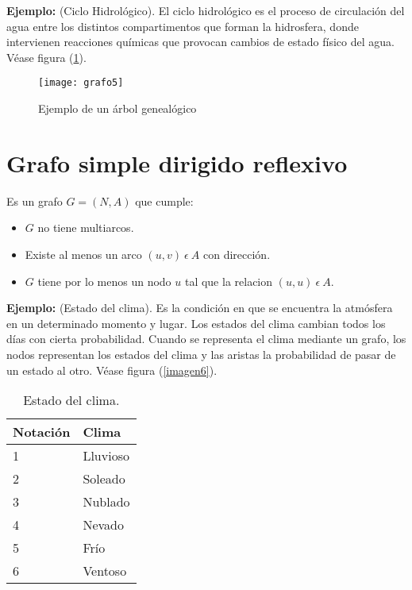 \documentclass[a4paper, 11pt]{article}
\begin{document}
\textbf{Ejemplo:} (Ciclo Hidrológico). El ciclo hidrológico es el proceso de circulación del agua entre los distintos compartimentos que forman la hidrosfera, donde intervienen reacciones químicas que provocan cambios de estado físico del agua. Véase figura (\ref{imagen5}).

\begin{figure}[H]
  \centering
    \texttt{[image: grafo5]}
  \caption{Ejemplo de un árbol genealógico}
  \label{imagen5}
\end{figure}






\section*{Grafo simple dirigido reflexivo}

Es un grafo $G = (N, A)$ que cumple:
\begin{itemize}
\item $G$ no tiene multiarcos.
\item Existe al menos un arco $(u, v) \ \epsilon \ A$ con dirección.
\item $G$ tiene por lo menos un nodo $u$ tal que la relacion $(u, u) \ \epsilon \ A$.
\end{itemize}


\textbf{Ejemplo:} (Estado del clima). Es la condición en que se encuentra la atmósfera en un determinado momento y lugar. Los estados del clima cambian todos los días con cierta probabilidad. Cuando se representa el clima mediante un grafo, los nodos representan los estados del clima y las aristas la probabilidad de pasar de un estado al otro. Véase figura (\ref{imagen6}).


\begin{table}[H]
\begin{center}
\caption{Estado del clima.}
\begin{tabular}{|l|l|}
\hline 
 Notación  &Clima \\  \hline \hline
1 &Lluvioso  \\ \hline
2 &Soleado\\ \hline
3  &Nublado \\ \hline
4  &Nevado\\ \hline
5  &Frío \\ \hline
6  &Ventoso\\ \hline
\end{tabular}
\label{tabla2}
\end{center}
\end{table}
\end{document}
